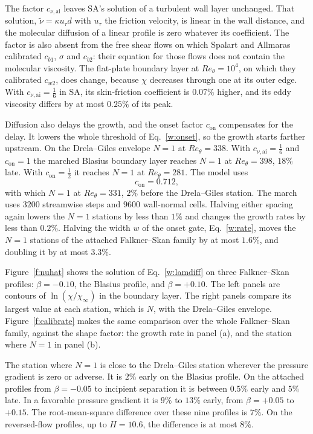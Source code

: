 \documentclass[conf]{new-aiaa}
\newcommand{\con}{c_{\mathrm{on}}}
\begin{document}
The factor $c_{\nu,\mathrm{ai}}$ leaves SA's solution of a turbulent wall layer
unchanged. That solution, $\tilde\nu=\kappa u_\tau d$ with $u_\tau$ the friction velocity, is linear in the wall
distance, and the molecular diffusion of a linear profile is zero whatever its
coefficient. The factor is also absent from the free shear flows on which
Spalart and Allmaras~\cite{spalart_allmaras_1994} calibrated $c_{b1}$,
$\sigma$ and $c_{b2}$: their equation for those flows does not contain the
molecular viscosity. The flat-plate boundary layer at $Re_\theta=10^4$, on
which they calibrated $c_{w2}$, does change, because $\chi$ decreases through
one at its outer edge. With $c_{\nu,\mathrm{ai}}=\tfrac16$ in SA, its
skin-friction coefficient is $0.07\%$ higher, and its eddy viscosity differs by
at most $0.25\%$ of its peak.

Diffusion also delays the growth, and the onset factor $\con$ compensates for
the delay. It lowers the whole threshold of Eq.~\eqref{w:onset}, so the growth
starts farther upstream. On the Drela--Giles envelope $N=1$ at
$Re_\theta=338$. With $c_{\nu,\mathrm{ai}}=\tfrac16$ and $\con=1$ the marched
Blasius boundary layer reaches $N=1$ at $Re_\theta=398$, $18\%$ late. With
$\con=\tfrac12$ it reaches $N=1$ at $Re_\theta=281$. The model uses
\begin{equation*}
  \con=0.712 ,
\end{equation*}
with which $N=1$ at $Re_\theta=331$, $2\%$ before the Drela--Giles station.
The march uses $3200$ streamwise steps and $9600$ wall-normal cells. Halving
either spacing again lowers the $N=1$ stations by less than $1\%$ and changes
the growth rates by less than $0.2\%$. Halving the width $w$ of the onset gate,
Eq.~\eqref{w:rate}, moves the $N=1$ stations of the attached Falkner--Skan
family by at most $1.6\%$, and doubling it by at most $3.3\%$.

Figure~\ref{f:nuhat} shows the solution of Eq.~\eqref{w:lamdiff} on three
Falkner--Skan profiles: $\beta=-0.10$, the Blasius profile, and $\beta=+0.10$.
The left panels are contours of $\ln(\chi/\chi_\infty)$ in the boundary layer.
The right panels compare its largest value at each station, which is $N$, with
the Drela--Giles envelope. Figure~\ref{f:calibrate} makes the same comparison
over the whole Falkner--Skan family, against the shape factor: the growth rate
in panel (a), and the station where $N=1$ in panel (b).

The station where $N=1$ is close to the Drela--Giles station wherever the
pressure gradient is zero or adverse. It is $2\%$ early on the Blasius
profile. On the attached profiles from $\beta=-0.05$ to incipient separation
it is between $0.5\%$ early and $5\%$ late. In a favorable pressure gradient
it is $9\%$ to $13\%$ early, from $\beta=+0.05$ to $+0.15$. The
root-mean-square difference over these nine profiles is $7\%$. On the
reversed-flow profiles, up to $H=10.6$, the difference is at most $8\%$.
\end{document}
